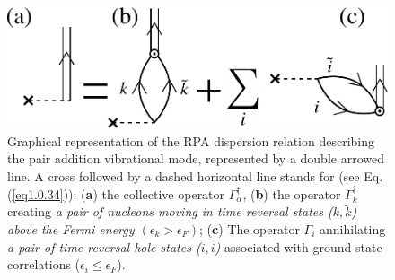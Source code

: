 \begin{figure}
	\centerline {
		\includegraphics*[width=12cm]{introduccion/figs/fig_preface_3_1}
	}
	\caption{Graphical representation of the RPA dispersion relation describing the pair addition  vibrational mode, represented by a double arrowed line.  A cross followed by a dashed horizontal line stands for (see Eq. (\ref{eq1.0.34})): (\textbf{a}) the collective operator $\Gamma_\alpha^\dagger$, (\textbf{b}) the operator $\Gamma_k^\dagger$ creating \textit{a pair of nucleons moving in time reversal  states ($k,\tilde k$) above the Fermi energy $(\epsilon_k>\epsilon_F)$}; (\textbf{c}) The operator $\Gamma_i$ annihilating \textit{a pair of time reversal hole states ($i,\tilde i$)} associated with ground state correlations ($\epsilon_i\leq\epsilon_F$).}
	\label{fig0.3.1}
\end{figure}
